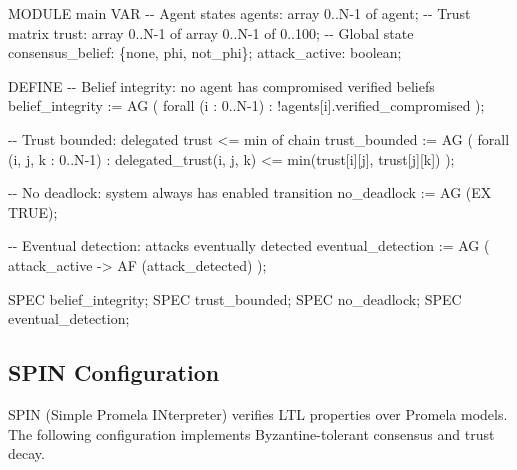 \documentclass[
]{article}
\newenvironment{Shaded}{}{}
\newcommand{\NormalTok}[1]{#1}
\newcounter{none} %
\begin{document}
\begin{Shaded}
\begin{Highlighting}[]
\NormalTok{MODULE main}
\NormalTok{VAR}
\NormalTok{  {-}{-} Agent states}
\NormalTok{  agents: array 0..N{-}1 of agent;}
\NormalTok{  {-}{-} Trust matrix}
\NormalTok{  trust: array 0..N{-}1 of array 0..N{-}1 of 0..100;}
\NormalTok{  {-}{-} Global state}
\NormalTok{  consensus\_belief: \{none, phi, not\_phi\};}
\NormalTok{  attack\_active: boolean;}

\NormalTok{DEFINE}
\NormalTok{  {-}{-} Belief integrity: no agent has compromised verified beliefs}
\NormalTok{  belief\_integrity := AG (}
\NormalTok{    forall (i : 0..N{-}1) :}
\NormalTok{      !agents[i].verified\_compromised}
\NormalTok{  );}

\NormalTok{  {-}{-} Trust bounded: delegated trust \textless{}= min of chain}
\NormalTok{  trust\_bounded := AG (}
\NormalTok{    forall (i, j, k : 0..N{-}1) :}
\NormalTok{      delegated\_trust(i, j, k) \textless{}= min(trust[i][j], trust[j][k])}
\NormalTok{  );}

\NormalTok{  {-}{-} No deadlock: system always has enabled transition}
\NormalTok{  no\_deadlock := AG (EX TRUE);}

\NormalTok{  {-}{-} Eventual detection: attacks eventually detected}
\NormalTok{  eventual\_detection := AG (}
\NormalTok{    attack\_active {-}\textgreater{} AF (attack\_detected)}
\NormalTok{  );}

\NormalTok{SPEC belief\_integrity;}
\NormalTok{SPEC trust\_bounded;}
\NormalTok{SPEC no\_deadlock;}
\NormalTok{SPEC eventual\_detection;}
\end{Highlighting}
\end{Shaded}

\subsection{SPIN Configuration}\label{sec:spin-config}

SPIN (Simple Promela INterpreter) verifies LTL properties over Promela
models. The following configuration implements Byzantine-tolerant
consensus and trust decay.
\end{document}
